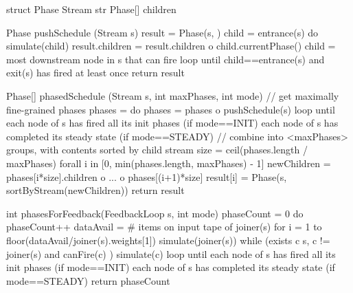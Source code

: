 struct Phase {
  Stream str
  Phase[] children
}

Phase pushSchedule (Stream s) {
  result = Phase(s, {})
  child = entrance(s)
  do {
    simulate(child)
    result.children = result.children o child.currentPhase()
    child = most downstream node in s that can fire
  } loop until child==entrance(s) and exit(s) has fired at least once
  return result
}

Phase[] phasedSchedule (Stream s, int maxPhases, int mode) {
  // get maximally fine-grained phases
  phases = {}
  do {
    phases = phases o pushSchedule(s)
  } loop until {each node of s has fired all its init phases    (if mode==INIT)
                each node of s has completed its steady state   (if mode==STEADY) }
  // combine into <maxPhases> groups, with contents sorted by child stream
  size = ceil(phases.length / maxPhases)
  forall i in [0, min(phases.length, maxPhases) - 1] {
    newChildren = phases[i*size].children o ... o phases[(i+1)*size]
    result[i] = Phase(s, sortByStream(newChildren))
  }
  return result
}

int phasesForFeedback(FeedbackLoop s, int mode) {
  phaseCount = 0
  do {
    phaseCount++
    dataAvail = # items on input tape of joiner(s)
    for i = 1 to floor(dataAvail/joiner(s).weights[1])
      simulate(joiner(s))
    while (exists c \in s, c != joiner(s) and canFire(c) )
      simulate(c)
  } loop until {each node of s has fired all its init phases    (if mode==INIT)
                each node of s has completed its steady state   (if mode==STEADY) }
  return phaseCount
}

